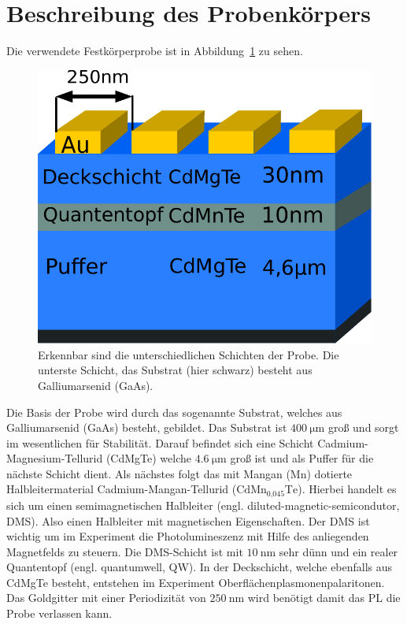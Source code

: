 \section{Beschreibung des Probenkörpers}\label{sec:probe}
Die verwendete Festkörperprobe ist in Abbildung~\ref{fig:probe} zu sehen.
\begin{figure}
    \centering
    \includegraphics[scale=0.5]{./Plots/probe.pdf}
    \caption{Erkennbar sind die unterschiedlichen Schichten der Probe.
    Die unterste Schicht, das Substrat (hier schwarz) besteht aus Galliumarsenid (GaAs).}
    \label{fig:probe}
\end{figure}
\FloatBarrier

Die Basis der Probe wird durch das sogenannte Substrat, welches aus Galliumarsenid (GaAs) besteht, gebildet.
Das Substrat ist $\SI{400}{\micro\meter}$ groß und sorgt im wesentlichen für Stabilität.
Darauf befindet sich eine Schicht Cadmium-Magnesium-Tellurid (CdMgTe) welche $\SI{4,6}{\micro\meter}$ groß ist
und als Puffer für die nächste Schicht dient.
Als nächstes folgt das mit Mangan (Mn) dotierte Halbleitermaterial Cadmium-Mangan-Tellurid 
($\text{Cd}\text{Mn}_\text{0,045}\text{Te}$). 
Hierbei handelt es sich um einen semimagnetischen Halbleiter (engl. diluted-magnetic-semicondutor, DMS).\cite{allg_paper}
Also einen Halbleiter mit magnetischen Eigenschaften. 
Der DMS ist wichtig um im Experiment die Photolumineszenz mit Hilfe des anliegenden
Magnetfelds zu steuern. 
Die DMS-Schicht ist mit $\SI{10}{\nano\meter}$ sehr dünn und ein realer Quantentopf (engl. quantumwell, QW).
In der Deckschicht, welche ebenfalls aus CdMgTe besteht, entstehen im Experiment Oberflächenplasmonenpalaritonen.
Das Goldgitter mit einer Periodizität von $\SI{250}{\nano\meter}$ wird benötigt damit das PL die Probe verlassen kann.
